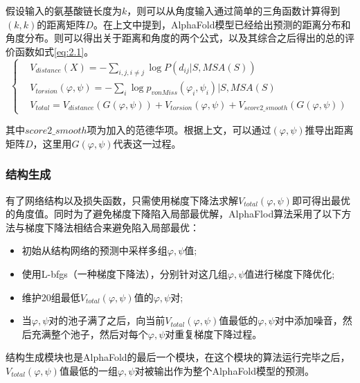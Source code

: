 \documentclass[withoutpreface,bwprint]{cumcmthesis}
\begin{document}
假设输入的氨基酸链长度为$k$，则可以从角度输入通过简单的三角函数计算得到$(k,k)$的距离矩阵$D$。在上文中提到，AlphaFold模型已经给出预测的距离分布和角度分布。则可以得出关于距离和角度的两个公式，以及其综合之后得出的总的评价函数如式\cref{eq:2.1}。
\begin{equation}
    \begin{cases}
         & V_{distance}(X)=-\sum_{i,j,i\neq j}{\log{P(d_{ij}|S,MSA(S))}}                                         \\
         & V_{torsion}(\varphi,\psi)=-\sum_i{\log{p_{vonMiss}(\varphi_i,\psi_i)|S,MSA(S)}}                       \\
         & V_{total}=V_{distance}(G(\varphi,\psi))+V_{torsion}(\varphi,\psi)+V_{score2\_smooth}(G(\varphi,\psi))
    \end{cases}
    \label{eq:2.1}
\end{equation}

其中$score2\_smooth$项为加入的范德华项。根据上文，可以通过$(\varphi,\psi)$推导出距离矩阵$D$，这里用$G(\varphi,\psi)$代表这一过程。

\subsubsection{结构生成}

有了网络结构以及损失函数，只需使用梯度下降法求解$V_{total}(\varphi,\psi)$即可得出最优的角度值。同时为了避免梯度下降陷入局部最优解，AlphaFlod算法采用了以下方法与梯度下降法相结合来避免陷入局部最优：
\begin{itemize}
    \item 初始从结构网络的预测中采样多组$\varphi,\psi$值;
    \item 使用L-bfgs（一种梯度下降法），分别针对这几组$\varphi,\psi$值进行梯度下降优化;
    \item 维护20组最低$V_{total}(\varphi,\psi)$值的$\varphi,\psi$对;
    \item 当$\varphi,\psi$对的池子满了之后，向当前$V_{total}(\varphi,\psi)$值最低的$\varphi,\psi$对中添加噪音，然后充满整个池子，然后对每个$\varphi,\psi$对重复梯度下降过程。
\end{itemize}

结构生成模块也是AlphaFold的最后一个模块，在这个模块的算法运行完毕之后，$V_{total}(\varphi,\psi)$值最低的一组$\varphi,\psi$对被输出作为整个AlphaFold模型的预测。
\end{document}
